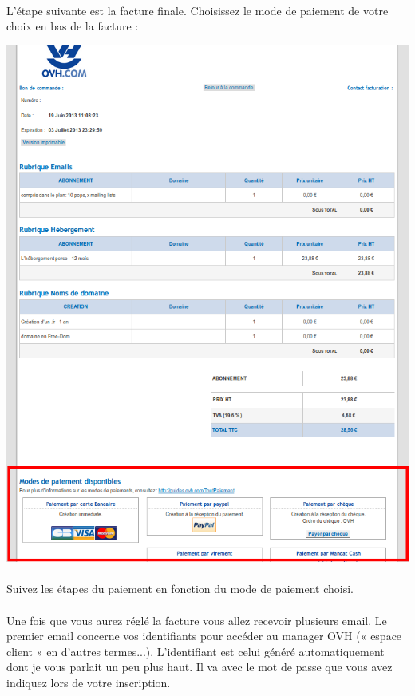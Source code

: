 \documentclass[10pt,a4paper]{article}
\begin{document}
\paragraph{}L'étape suivante est la facture finale. Choisissez le mode de paiement de votre choix en bas de la facture :
\begin{center}
\includegraphics[scale=0.4]{img/0287.png}
\end{center}
\paragraph{}Suivez les étapes du paiement en fonction du mode de paiement choisi.
\newpage
\paragraph{}Une fois que vous aurez réglé la facture vous allez recevoir plusieurs email. Le premier email concerne vos identifiants pour accéder au manager OVH (« espace client » en d'autres termes...). L'identifiant est celui généré automatiquement dont je vous parlait un peu plus haut. Il va avec le mot de passe que vous avez indiquez lors de votre inscription.
\end{document}
